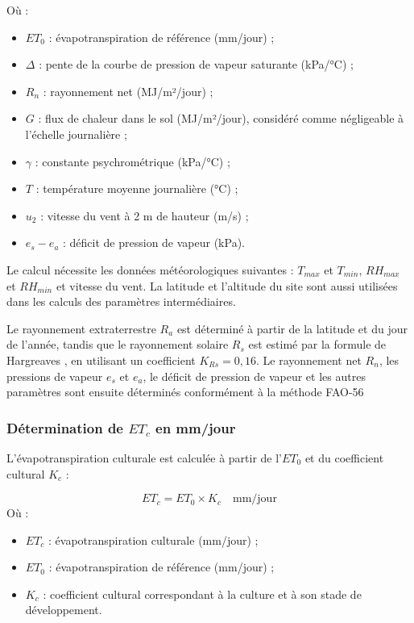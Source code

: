 Où :
\begin{itemize}[label=$\bullet$]
   	\item $ET_0$ : évapotranspiration de référence (mm/jour) ;
 
    \item $\Delta$ : pente de la courbe de pression de vapeur saturante (kPa/°C) ;

    \item $R_n$ : rayonnement net (MJ/m²/jour) ;

    \item $G$ : flux de chaleur dans le sol (MJ/m²/jour), considéré comme négligeable à l’échelle journalière ;

    \item $\gamma$ : constante psychrométrique (kPa/°C) ;

    \item $T$ : température moyenne journalière (°C) ;

    \item $u_2$ : vitesse du vent à 2 m de hauteur (m/s) ;

    \item $e_s-e_a$ : déficit de pression de vapeur (kPa).

\end{itemize}
Le calcul nécessite les données météorologiques suivantes : $T_{max}$ et $T_{min}$, $RH_{max}$ et $RH_{min}$ et vitesse du vent. La latitude et l’altitude du site sont aussi utilisées dans les calculs des paramètres intermédiaires.

Le rayonnement extraterrestre $R_a$ est déterminé à partir de la latitude et du jour de l’année, tandis que le rayonnement solaire $R_s$ est estimé par la formule de Hargreaves \cite{koc_reference_2023}, en utilisant un coefficient $K_{Rs}=0,16$.
Le rayonnement net $R_n$, les pressions de vapeur $e_s$ et $e_a$, le déficit de pression de vapeur et les autres paramètres sont ensuite déterminés conformément à la méthode FAO-56 \cite[chap.~3]{allen_crop_1998-1}

\subsubsection{Détermination de \texorpdfstring{$ET_c$}{ETc} en mm/jour}
L’évapotranspiration culturale est calculée à partir de l’$ET_0$ et du coefficient cultural $K_c$ :

\begin{equation}
    ET_c = ET_0 \times K_c \quad \text{mm/jour}
    \label{eq:etc_final}
\end{equation}
Où :
\begin{itemize}[label=$\bullet$]
   	\item $ET_c$ : évapotranspiration culturale (mm/jour) ;

    \item $ET_0$ : évapotranspiration de référence (mm/jour) ;

    \item $K_c$ : coefficient cultural correspondant à la culture et à son stade de développement.
\end{itemize}

